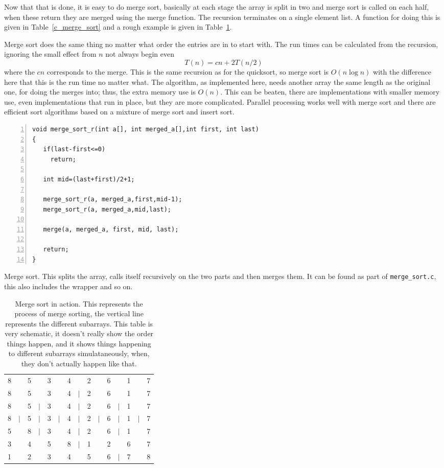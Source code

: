 \documentclass[11pt,a4paper]{scrartcl}
\begin{document}
Now that that is done, it is easy to do merge sort, basically at each
stage the array is split in two and merge sort is called on each half,
when these return they are merged using the merge function. The
recursion terminates on a single element list. A function for doing
this is given in Table~\ref{c_merge_sort} and a rough example is given
in Table~\ref{table_merge_sort}.

Merge sort does the same thing no matter what order the entries are in
to start with. The run times can be calculated from the recursion,
ignoring the small effect from $n$ not always begin even
\begin{equation}
T(n)=cn+2T(n/2)
\end{equation}
where the $cn$ corresponds to the merge. This is the same recursion as
for the quicksort, so merge sort is $O(n\log{n})$ with the difference
here that this is the run time no matter what. The algorithm, as
implemented here, needs another array the same length as the original
one, for doing the merges into; thus, the extra memory use is
$O(n)$. This can be beaten, there are implementations with smaller
memory use, even implementations that run in place, but they are more
complicated. Parallel processing works well with merge sort and there
are efficient sort algorithms based on a mixture of merge sort and
insert sort.

\begin{table}
\begin{lstlisting}[numbers=left]
void merge_sort_r(int a[], int merged_a[],int first, int last)
{
   if(last-first<=0)
     return;

   int mid=(last+first)/2+1;

   merge_sort_r(a, merged_a,first,mid-1);
   merge_sort_r(a, merged_a,mid,last);

   merge(a, merged_a, first, mid, last);

   return;
}
\end{lstlisting}
\caption{Merge sort. This splits the array, calls itself recursively
  on the two parts and then merges them. It can be found as part of
  {\tt merge\_sort.c}, this also includes the wrapper and so
  on. \label{c_merge_sort}}
\end{table}


\begin{table}
\begin{tabular}{ccccccccccccccc}
8&&5&&3&&4&&2&&6&&1&&7\\
8&&5&&3&&4&$|$&2&&6&&1&&7\\
8&&5&$|$&3&&4&$|$&2&&6&$|$&1&&7\\
8&$|$&5&$|$&3&$|$&4&$|$&2&$|$&6&$|$&1&$|$&7\\
5&&8&$|$&3&&4&$|$&2&&6&$|$&1&&7\\
3&&4&&5&&8&$|$&1&&2&&6&&7\\
1&&2&&3&&4&&5&&6&$|$&7&&8
\end{tabular}
\caption{Merge sort in action. This represents the process of merge
  sorting, the vertical line represents the different subarrays. This
  table is very schematic, it doesn't really show the order things
  happen, and it shows things happening to different subarrays
  simulataneously, when, they don't actually happen like
  that.\label{table_merge_sort}}
\end{table}
\end{document}
